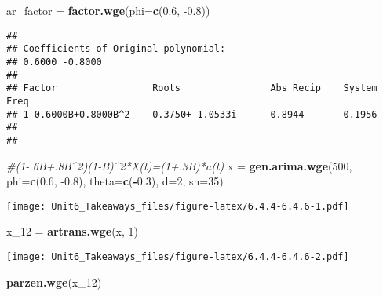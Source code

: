\documentclass[]{article}
\newenvironment{Shaded}{\begin{snugshade}}{\end{snugshade}}
\newcommand{\CommentTok}[1]{\textcolor[rgb]{0.56,0.35,0.01}{\textit{#1}}}
\newcommand{\DataTypeTok}[1]{\textcolor[rgb]{0.13,0.29,0.53}{#1}}
\newcommand{\DecValTok}[1]{\textcolor[rgb]{0.00,0.00,0.81}{#1}}
\newcommand{\FloatTok}[1]{\textcolor[rgb]{0.00,0.00,0.81}{#1}}
\newcommand{\KeywordTok}[1]{\textcolor[rgb]{0.13,0.29,0.53}{\textbf{#1}}}
\newcommand{\NormalTok}[1]{#1}
\newcommand{\OperatorTok}[1]{\textcolor[rgb]{0.81,0.36,0.00}{\textbf{#1}}}
\newcommand{\StringTok}[1]{\textcolor[rgb]{0.31,0.60,0.02}{#1}}
\begin{document}
\begin{Shaded}
\begin{Highlighting}[]
\NormalTok{ar_factor =}\StringTok{ }\KeywordTok{factor.wge}\NormalTok{(}\DataTypeTok{phi=}\KeywordTok{c}\NormalTok{(}\FloatTok{0.6}\NormalTok{, }\FloatTok{-0.8}\NormalTok{))}
\end{Highlighting}
\end{Shaded}

\begin{verbatim}
## 
## Coefficients of Original polynomial:  
## 0.6000 -0.8000 
## 
## Factor                 Roots                Abs Recip    System Freq 
## 1-0.6000B+0.8000B^2    0.3750+-1.0533i      0.8944       0.1956
##   
## 
\end{verbatim}

\begin{Shaded}
\begin{Highlighting}[]
\CommentTok{#(1-.6B+.8B^2)(1-B)^2*X(t)=(1+.3B)*a(t)}
\NormalTok{x =}\StringTok{ }\KeywordTok{gen.arima.wge}\NormalTok{(}\DecValTok{500}\NormalTok{, }\DataTypeTok{phi=}\KeywordTok{c}\NormalTok{(}\FloatTok{0.6}\NormalTok{, }\FloatTok{-0.8}\NormalTok{), }\DataTypeTok{theta=}\KeywordTok{c}\NormalTok{(}\OperatorTok{-}\FloatTok{0.3}\NormalTok{), }\DataTypeTok{d=}\DecValTok{2}\NormalTok{, }\DataTypeTok{sn=}\DecValTok{35}\NormalTok{)}
\end{Highlighting}
\end{Shaded}

\texttt{[image: Unit6\_Takeaways\_files/figure-latex/6.4.4-6.4.6-1.pdf]}

\begin{Shaded}
\begin{Highlighting}[]
\NormalTok{x_}\DecValTok{12}\NormalTok{ =}\StringTok{ }\KeywordTok{artrans.wge}\NormalTok{(x, }\DecValTok{1}\NormalTok{)}
\end{Highlighting}
\end{Shaded}

\texttt{[image: Unit6\_Takeaways\_files/figure-latex/6.4.4-6.4.6-2.pdf]}

\begin{Shaded}
\begin{Highlighting}[]
\KeywordTok{parzen.wge}\NormalTok{(x_}\DecValTok{12}\NormalTok{)}
\end{Highlighting}
\end{Shaded}
\end{document}
